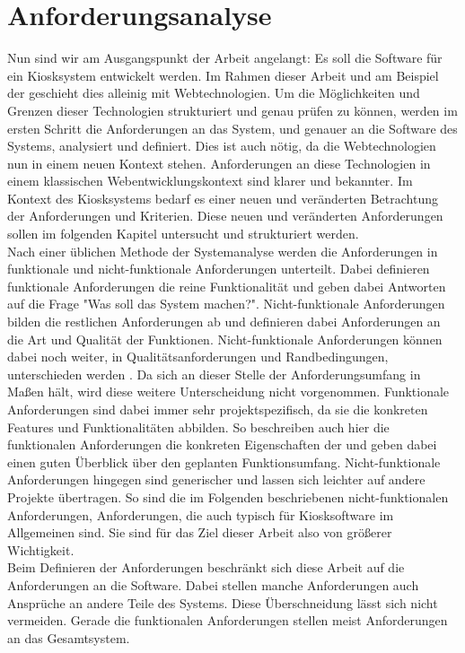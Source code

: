 \chapter{Anforderungsanalyse}
\label{section:anforderungen}

Nun sind wir am Ausgangspunkt der Arbeit angelangt: Es soll die Software für ein Kiosksystem
entwickelt werden. Im Rahmen dieser Arbeit und am Beispiel der \shst{}
geschieht dies alleinig mit Webtechnologien. Um die Möglichkeiten und Grenzen dieser Technologien
strukturiert und genau prüfen zu können, werden im ersten Schritt die Anforderungen an das System,
und genauer an die Software des Systems, analysiert und definiert. 
Dies ist auch nötig, da die Webtechnologien nun in einem neuen Kontext stehen. Anforderungen an diese
Technologien in einem klassischen Webentwicklungskontext sind klarer und bekannter. Im Kontext
des Kiosksystems bedarf es einer neuen und veränderten Betrachtung der Anforderungen und Kriterien.
Diese neuen und veränderten Anforderungen sollen im folgenden Kapitel untersucht und strukturiert
werden.\\

Nach einer üblichen Methode der Systemanalyse werden die Anforderungen in funktionale und 
nicht-funktionale Anforderungen unterteilt. Dabei definieren funktionale Anforderungen die 
reine Funktionalität und geben dabei Antworten 
auf die Frage "Was soll das System machen?". Nicht-funktionale Anforderungen bilden die
restlichen Anforderungen ab und definieren dabei Anforderungen an die Art und Qualität der
Funktionen. Nicht-funktionale Anforderungen können dabei noch weiter, in Qualitätsanforderungen 
und Randbedingungen, unterschieden werden \cite[S.20 f.]{systemanalyse}. 
Da sich an dieser Stelle der Anforderungsumfang in Maßen hält, wird diese weitere Unterscheidung
nicht vorgenommen.
Funktionale Anforderungen sind dabei immer sehr projektspezifisch, da sie die konkreten Features
und Funktionalitäten abbilden. So beschreiben auch hier die funktionalen Anforderungen die konkreten
Eigenschaften der \shst{} und geben dabei einen guten Überblick über den geplanten Funktionsumfang.
Nicht-funktionale Anforderungen hingegen sind generischer und lassen sich leichter auf andere Projekte
übertragen. So sind die im Folgenden beschriebenen nicht-funktionalen Anforderungen, Anforderungen, die
auch typisch für Kiosksoftware im Allgemeinen sind. Sie sind für das Ziel dieser Arbeit also von 
größerer Wichtigkeit.\\
Beim Definieren der Anforderungen beschränkt sich diese Arbeit auf die Anforderungen an die Software.
Dabei stellen manche Anforderungen auch Ansprüche an andere Teile des Systems. Diese Überschneidung
lässt sich nicht vermeiden. Gerade die funktionalen Anforderungen stellen meist Anforderungen an das 
Gesamtsystem.\\ 

